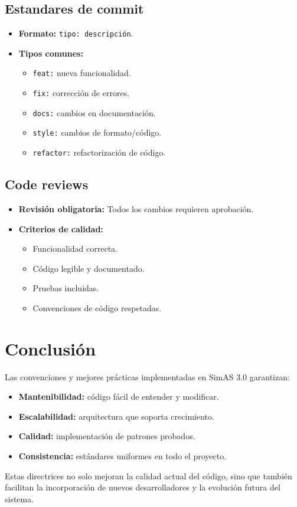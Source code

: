 \subsection{Estandares de commit}

\begin{itemize}
    \item \textbf{Formato:} \texttt{tipo: descripción}.
    \item \textbf{Tipos comunes:}
    \begin{itemize}
        \item \texttt{feat:} nueva funcionalidad.
        \item \texttt{fix:} corrección de errores.
        \item \texttt{docs:} cambios en documentación.
        \item \texttt{style:} cambios de formato/código.
        \item \texttt{refactor:} refactorización de código.
    \end{itemize}
\end{itemize}

\subsection{Code reviews}

\begin{itemize}
    \item \textbf{Revisión obligatoria:} Todos los cambios requieren aprobación.
    \item \textbf{Criterios de calidad:}
    \begin{itemize}
        \item Funcionalidad correcta.
        \item Código legible y documentado.
        \item Pruebas incluidas.
        \item Convenciones de código respetadas.
    \end{itemize}
\end{itemize}

\section{Conclusión}

Las convenciones y mejores prácticas implementadas en SimAS 3.0 garantizan:
\begin{itemize}
    \item \textbf{Mantenibilidad:} código fácil de entender y modificar.
    \item \textbf{Escalabilidad:} arquitectura que soporta crecimiento.
    \item \textbf{Calidad:} implementación de patrones probados.
    \item \textbf{Consistencia:} estándares uniformes en todo el proyecto.
\end{itemize}

Estas directrices no solo mejoran la calidad actual del código, sino que también facilitan la incorporación de nuevos desarrolladores y la evolución futura del sistema.
